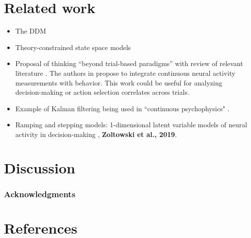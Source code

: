 \documentclass{article}
\begin{document}
\section{Related work}
\begin{itemize}
\item The DDM \cite{ratcliff2008diffusion,gold2007neural}
\item Theory-constrained state space models \cite{linderman2017using}
\item Proposal of thinking ``beyond trial-based paradigms'' with review of relevant literature \cite{huk2018beyond}. The authors in  \cite{huk2018beyond} propose to integrate continuous neural activity measurements with behavior. This work could be useful for analyzing decision-making or action selection correlates across trials.
\item Example of Kalman filtering being used in ``continuous psychophysics" \cite{bonnen2015continuous}.
\item Ramping and stepping models: 1-dimensional latent variable models of neural activity in decision-making \cite{latimer2015single}, \textbf{Zoltowski et al., 2019}. 
\end{itemize}

\section{Discussion}


\subsubsection*{Acknowledgments}


\section*{References}

\medskip

\small

%

\end{document}
